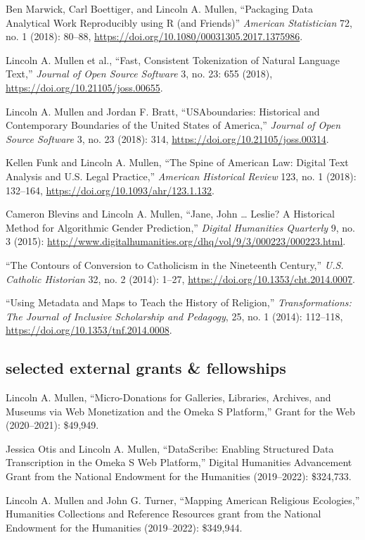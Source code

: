 \documentclass[11pt]{article}
\begin{document}
Ben Marwick, Carl Boettiger, and Lincoln A. Mullen, ``Packaging Data Analytical Work Reproducibly using R (and Friends)'' \emph{American Statistician} 72, no. 1 (2018): 80--88, \url{https://doi.org/10.1080/00031305.2017.1375986}.

Lincoln A. Mullen et al., ``Fast, Consistent Tokenization of Natural Language Text,'' \emph{Journal of Open Source Software} 3, no. 23: 655 (2018), \url{https://doi.org/10.21105/joss.00655}.

Lincoln A. Mullen and Jordan F. Bratt, ``USAboundaries: Historical and Contemporary Boundaries of the United States of America,'' \emph{Journal of Open Source Software} 3, no. 23 (2018): 314, \url{https://doi.org/10.21105/joss.00314}.

Kellen Funk and Lincoln A. Mullen, ``The Spine of American Law: Digital Text Analysis and U.S. Legal Practice,'' \emph{American Historical Review} 123, no.  1 (2018): 132--164, \url{https://doi.org/10.1093/ahr/123.1.132}.

Cameron Blevins and Lincoln A. Mullen, ``Jane, John \ldots{} Leslie? A Historical Method for Algorithmic Gender Prediction,'' \emph{Digital Humanities Quarterly} 9, no. 3 (2015): \url{http://www.digitalhumanities.org/dhq/vol/9/3/000223/000223.html}. 

``The Contours of Conversion to Catholicism in the Nineteenth Century,'' \emph{U.S. Catholic Historian} 32, no. 2 (2014): 1--27, \url{https://doi.org/10.1353/cht.2014.0007}. 

``Using Metadata and Maps to Teach the History of Religion,'' \emph{Transformations: The Journal of Inclusive Scholarship and Pedagogy}, 25, no. 1 (2014): 112--118, \url{https://doi.org/10.1353/tnf.2014.0008}.

\subsection{selected external grants \& fellowships}\label{grants-and-fellowships}

Lincoln A. Mullen, ``Micro-Donations for Galleries, Libraries, Archives, and Museums via Web Monetization and the Omeka S Platform,'' Grant for the Web (2020--2021): \$49,949.

Jessica Otis and Lincoln A. Mullen, ``DataScribe: Enabling Structured Data Transcription in the Omeka S Web
Platform,'' Digital Humanities Advancement Grant from the National Endowment for the Humanities (2019--2022): \$324,733.

Lincoln A. Mullen and John G. Turner, ``Mapping American Religious Ecologies,'' Humanities Collections and Reference Resources grant from the National Endowment for the Humanities (2019--2022): \$349,944.
\end{document}
